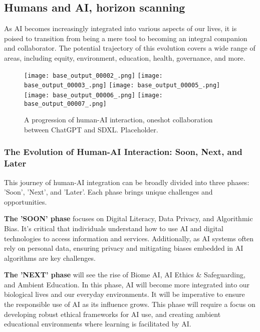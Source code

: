 \subsection{Humans and AI, horizon scanning}
As AI becomes increasingly integrated into various aspects of our lives, it is poised to transition from being a mere tool to becoming an integral companion and collaborator. The potential trajectory of this evolution covers a wide range of areas, including equity, environment, education, health, governance, and more.
\begin{figure}[ht]
\centering
\texttt{[image: base\_output\_00002\_.png]}
\hfill
\texttt{[image: base\_output\_00003\_.png]}
\hfill
\texttt{[image: base\_output\_00005\_.png]}
\hfill
\texttt{[image: base\_output\_00006\_.png]}
\hfill
\texttt{[image: base\_output\_00007\_.png]}
\caption{A progression of human-AI interaction, oneshot collaboration between ChatGPT and SDXL. Placeholder.}
\end{figure}

\subsubsection{The Evolution of Human-AI Interaction: Soon, Next, and Later}
This journey of human-AI integration can be broadly divided into three phases: 'Soon', 'Next', and 'Later'. Each phase brings unique challenges and opportunities.\par 

\textbf{The 'SOON' phase} focuses on Digital Literacy, Data Privacy, and Algorithmic Bias. It's critical that individuals understand how to use AI and digital technologies to access information and services. Additionally, as AI systems often rely on personal data, ensuring privacy and mitigating biases embedded in AI algorithms are key challenges. \par

\textbf{The 'NEXT' phase} will see the rise of Biome AI, AI Ethics \& Safeguarding, and Ambient Education. In this phase, AI will become more integrated into our biological lives and our everyday environments. It will be imperative to ensure the responsible use of AI as its influence grows. This phase will require a focus on developing robust ethical frameworks for AI use, and creating ambient educational environments where learning is facilitated by AI.\par 

